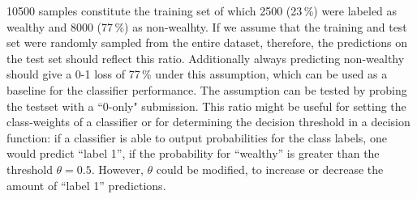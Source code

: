 10500 samples constitute the training set of which 2500 (23\,\%) were labeled as wealthy and 8000 (77\,\%) as non-wealhty. If we assume that the training and test set were randomly sampled from the entire dataset, therefore, the predictions on the test set should reflect this ratio. Additionally always predicting non-wealthy should give a 0-1 loss of 77\,\% under this assumption, which can be used as a baseline for the classifier performance. The assumption can be tested by probing the testset with a ``0-only" submission. This ratio might be useful for setting the class-weights of a classifier or for determining the decision threshold in a decision function: if a classifier is able to output probabilities for the class labels, one would predict ``label 1'', if the probability for ``wealthy'' is greater than the threshold $\theta = 0.5$. However, $\theta$ could be modified, to increase or decrease the amount of ``label 1'' predictions.